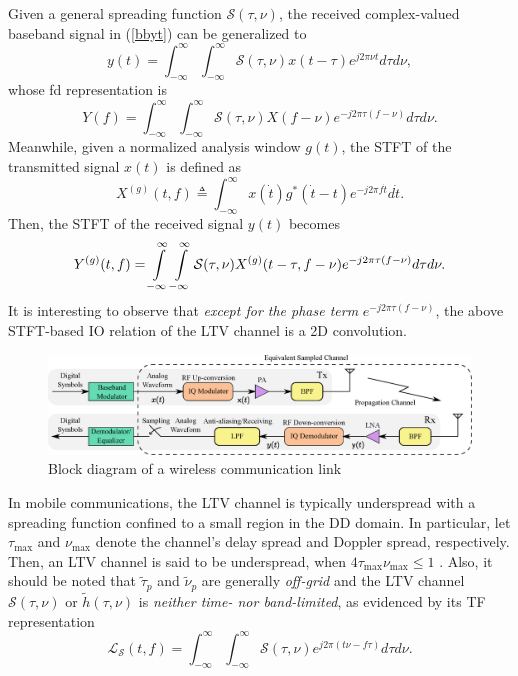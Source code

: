 \documentclass[journal]{IEEEtran}
\begin{document}
Given a general spreading function $\mathcal S(\tau,\nu) $, the received complex-valued  baseband signal in (\ref{bbyt}) can be generalized to
\begin{equation}
  y(t)=\int_{-\infty}^{\infty} \int_{-\infty}^{\infty} \mathcal S(\tau,\nu) x(t-\tau)e^{j2\pi \nu t} d\tau d\nu,
\end{equation}
whose \ac{fd} representation is
\begin{equation}
  Y(f)=\int_{-\infty}^{\infty} \int_{-\infty}^{\infty} \mathcal S(\tau,\nu) X(f-\nu)e^{-j2\pi \tau(f-\nu)} d\tau d\nu.
\end{equation}
Meanwhile, given a normalized analysis window $g(t)$, the STFT of the transmitted signal $x(t)$ is defined as
\begin{equation}
  X^{(g)}(t,f) \triangleq \int_{-\infty}^{\infty} x(\dot t) g^*(\dot t-t)e^{-j2\pi f \dot t} d \dot t.
\end{equation}
Then, the STFT of the received signal $y(t)$ becomes \cite{Hlawatsch2011}
\begin{equation}\label{stft_io}
  Y^{(g)}(t,f)=\int\displaylimits_{-\infty}^{\infty} \int\displaylimits_{-\infty}^{\infty} \mathcal S(\tau,\nu) X^{(g)}(t-\tau, f-\nu)e^{-j2\pi \tau (f-\nu)} d\tau d\nu.
\end{equation}
It is interesting to observe that \emph{except for the phase term} $e^{-j2\pi \tau (f-\nu)}$, the above STFT-based IO relation of the LTV channel is a 2D convolution.

\begin{figure}
  \centering
  \includegraphics[width=17.5cm]{tx_channel_rx}
  \caption{Block diagram of a wireless communication link}
  \label{eschannel}
\end{figure}

In mobile communications, the LTV channel is typically underspread with a spreading function confined to a small region in the DD domain. In particular, let $\tau_{\textrm{max}}$ and $\nu_{\textrm{max}}$ denote the channel's delay spread and Doppler spread, respectively.
Then, an LTV channel is said to be underspread, when $4\tau_{\textrm{max}}\nu_{\textrm{max}}\le 1$ \cite{Hlawatsch2011}.
Also, it should be noted that $\tilde \tau_p$ and $\tilde \nu_p$ are generally \emph{off-grid} and
the LTV channel $\mathcal S(\tau,\nu)$ or $\tilde h (\tau,\nu)$ is \emph{neither time- nor band-limited}, as evidenced by its TF representation\cite{Hlawatsch2011}
\begin{equation}
  \mathcal L_{\mathcal S}(t, f)=\int_{-\infty}^{\infty} \int_{-\infty}^{\infty} \mathcal S(\tau,\nu) e^{j2\pi(t\nu-f\tau)} d\tau d\nu.
\end{equation}
\end{document}
